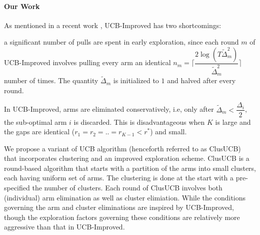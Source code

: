 \paragraph{Our Work}
As mentioned in a recent work \cite{liu2016modification}, UCB-Improved has two shortcomings: 	
\begin{inparaenum}[\bfseries (i)]
\item a significant number of pulls are spent in early exploration, since each round $m$ of UCB-Improved involves pulling every arm an identical $n_{m}=\bigg\lceil \dfrac{ 2\log(T\tilde{\Delta}^{2}_{m})}{\tilde{\Delta}^{2}_{m}} \bigg\rceil$ number of times. The quantity $\tilde{\Delta}_{m}$ is initialized to $1$ and halved after every round.
\item In UCB-Improved, arms are eliminated conservatively, i.e, only after $\tilde{\Delta}_{m}<\dfrac{\Delta_{i}}{2}$, the sub-optimal arm $i$ is discarded. This is disadvantageous when $K$ is large and the gaps are identical ($r_{1}=r_{2}=..=r_{K-1}<r^{*}$) and small.
\end{inparaenum}

We propose a variant of UCB algorithm (henceforth referred to as ClusUCB) that incorporates clustering and an improved exploration scheme. ClusUCB is a round-based algorithm that
starts with a partition of the arms into small clusters, each having uniform set of arms. 
The clustering is done at the start with a pre-specified the number of clusters. 
Each round of ClusUCB involves both (individual) arm elimination as well as cluster elimiation. While the conditions governing the arm and cluster eliminations are inspired by UCB-Improved, though the exploration factors governing these conditions are relatively more aggressive than that in UCB-Improved. 

